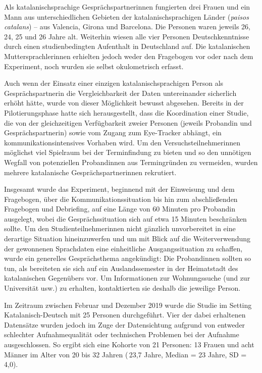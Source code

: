 Als katalanischsprachige Gesprächspartner{\textperiodcentered}innen fungierten drei Frauen und ein Mann aus unterschiedlichen Gebieten der katalanischsprachigen Länder (\emph{paisos catalans}) -- aus Valencia, Girona und Barcelona. Die Personen waren jeweils 26, 24, 25 und 26 Jahre alt. Weiterhin wiesen alle vier Personen Deutschkenntnisse durch einen studienbedingten Aufenthalt in Deutschland auf. Die katalanischen Muttersprachler{\textperiodcentered}innen erhielten jedoch weder den Fragebogen vor oder nach dem Experiment, noch wurden sie selbst okulometrisch erfasst.

Auch wenn der Einsatz einer einzigen katalanischsprachigen Person als Gesprächspartner{\textperiodcentered}in die Vergleichbarkeit der Daten untereinander sicherlich erhöht hätte, wurde von dieser Möglichkeit bewusst abgesehen. Bereits in der Pilotierungsphase hatte sich herausgestellt, dass die Koordination einer Studie, die von der gleichzeitigen Verfügbarkeit zweier Personen (jeweils Proband{\textperiodcentered}in und Gesprächspartner{\textperiodcentered}in) sowie vom Zugang zum Eye-Tracker abhängt, ein kommunikationsintensives Vorhaben wird. Um den Versuchsteilnehmer{\textperiodcentered}innen möglichst viel Spielraum bei der Terminfindung zu bieten und so den unnötigen Wegfall von potenziellen Proband{\textperiodcentered}innen aus Termingründen zu vermeiden, wurden mehrere katalanische Gesprächspartner{\textperiodcentered}innen rekrutiert.

Insgesamt wurde das Experiment, beginnend mit der Einweisung und dem Fragebogen, über die Kommunikationssituation bis hin zum abschließenden Fragebogen und Debriefing, auf eine Länge von 60 Minuten pro Proband{\textperiodcentered}in ausgelegt, wobei die Gesprächssituation sich auf etwa 15 Minuten beschränken sollte. Um den Studienteilnehmer{\textperiodcentered}innen nicht gänzlich unvorbereitet in eine derartige Situation hineinzuwerfen und um mit Blick auf die Weiterverwendung der gewonnenen Sprachdaten eine einheitliche Ausgangssituation zu schaffen, wurde ein generelles Gesprächsthema angekündigt: Die Proband{\textperiodcentered}innen sollten so tun, als bereiteten sie sich auf ein Auslandssemester in der Heimatstadt des katalanischen Gegenübers vor. Um Informationen zur Wohnungssuche (und zur Universität usw.) zu erhalten, kontaktierten sie deshalb die jeweilige Person.

Im Zeitraum zwischen Februar und Dezember 2019 wurde die Studie im Setting Katalanisch-Deutsch mit 25 Personen durchgeführt. Vier der dabei erhaltenen Datensätze wurden jedoch im Zuge der Datensichtung aufgrund von entweder schlechter Aufnahmequalität oder technischen Problemen bei der Aufnahme ausgeschlossen. So ergibt sich eine Kohorte von 21 Personen: 13 Frauen und acht Männer im Alter von 20 bis 32 Jahren (\diameter\,23,7 Jahre, Median = 23 Jahre, SD = 4,0).

